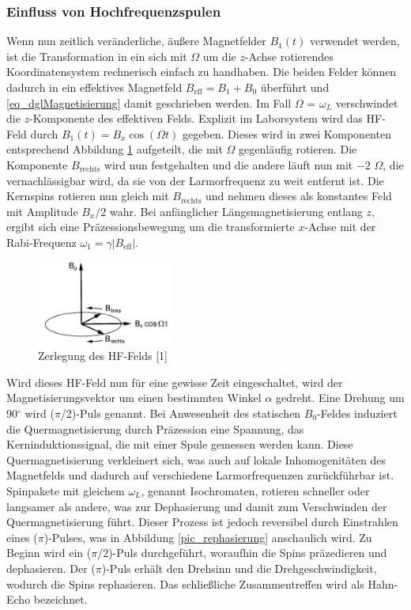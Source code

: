 \subsubsection{Einfluss von Hochfrequenzspulen}
\label{sec_hochfrequenz}
Wenn nun zeitlich veränderliche, äußere Magnetfelder $B_1(t)$ verwendet werden, ist die Transformation in ein sich mit $\Omega$ um die $z$-Achse rotierendes 
Koordinatensystem rechnerisch einfach zu handhaben. Die beiden Felder können dadurch in ein effektives Magnetfeld $B_\text{eff} = B_1 + B_0$ überführt
und \eqref{eq_dglMagnetisierung} damit geschrieben werden. Im Fall $\Omega$ = $\omega_L$ verschwindet die $z$-Komponente des effektiven Felds. Explizit im Laborsystem wird
das HF-Feld durch $B_1(t) = B_x \cos(\Omega t)$ gegeben. Dieses wird in zwei Komponenten entsprechend Abbildung \ref{pic_rotSystem} aufgeteilt, die mit
$\Omega$ gegenläufig rotieren. Die Komponente $B_\text{rechts}$ wird nun festgehalten und die andere läuft nun mit $-2$ $\Omega$, die vernachlässigbar wird,
da sie von der Larmorfrequenz zu weit entfernt ist. Die Kernspins rotieren nun gleich mit $B_\text{rechts}$ und nehmen dieses als konstantes Feld mit 
Amplitude $B_x /2$ wahr. Bei anfänglicher Längsmagnetisierung entlang $z$, ergibt sich eine Präzessionsbewegung um die transformierte $x$-Achse mit der
Rabi-Frequenz $\omega_1 = \gamma |B_\text{eff}|$.
\begin{figure}[H]
 \includegraphics[width=0.4\textwidth]{../pics/rotSystem.jpg}
 \caption{Zerlegung des HF-Felds [1]}
 \label{pic_rotSystem}
\end{figure}
\noindent
Wird dieses HF-Feld nun für eine gewisse Zeit eingeschaltet, wird der Magnetisierungsvektor um einen bestimmten Winkel $\alpha$ gedreht. Eine Drehung um
90$^\circ$ wird ($\pi$/2)-Puls genannt. Bei Anwesenheit des statischen $B_0$-Feldes induziert die Quermagnetisierung durch Präzession eine Spannung, das
Kerninduktionssignal, die mit einer Spule gemessen werden kann. Diese Quermagnetisierung verkleinert sich, was auch auf lokale Inhomogenitäten des 
Magnetfelds und dadurch auf verschiedene Larmorfrequenzen zurückführbar ist. Spinpakete mit gleichem $\omega_L$, genannt Isochromaten, rotieren schneller
oder langsamer als andere, was zur Dephasierung und damit zum Verschwinden der Quermagnetisierung führt. Dieser Prozess ist jedoch reversibel durch 
Einstrahlen eines ($\pi$)-Pulses, was in Abbildung \ref{pic_rephasierung} anschaulich wird. Zu Beginn wird ein ($\pi$/2)-Puls durchgeführt, woraufhin die
Spins präzedieren und dephasieren. Der ($\pi$)-Puls erhält den Drehsinn und die Drehgeschwindigkeit, wodurch die Spins rephasieren. Das schließliche 
Zusammentreffen wird als Hahn-Echo bezeichnet.

